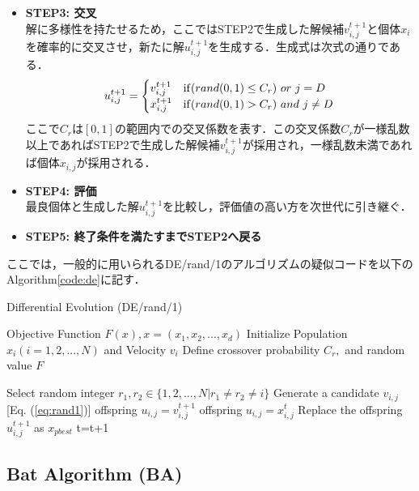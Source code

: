 \documentclass[a4j,11pt]{jarticle}
\begin{document}
\begin{itemize}
\item {\bf STEP3: 交叉} \\
解に多様性を持たせるため，ここではSTEP2で生成した解候補$v_{i,j}^{t+1}$と個体$x_i$を確率的に交叉させ，新たに解$u_{i,j}^{t+1}$を生成する．生成式は次式の通りである．
\begin{equation}
u_{i,j}^{t+1}=\begin{cases}
v_{i,j}^{t+1} & {\rm if}(rand(0,1) \leq C_r) \ or \ j=D \\
x_{i,j}^{t+1} & {\rm if}(rand(0,1) > C_r) \ and \ j \neq D
\end{cases}
\end{equation}
ここで$C_r$は$[0,1]$の範囲内での交叉係数を表す．この交叉係数$C_r$が一様乱数以上であればSTEP2で生成した解候補$v_{i,j}^{t+1}$が採用され，一様乱数未満であれば個体$x_{i,j}$が採用される．

\item {\bf STEP4: 評価} \\
最良個体と生成した解$u_{i,j}^{t+1}$を比較し，評価値の高い方を次世代に引き継ぐ．

\item {\bf STEP5: 終了条件を満たすまでSTEP2へ戻る}
\end{itemize}

ここでは，一般的に用いられるDE/rand/1のアルゴリズムの疑似コードを以下のAlgorithm\ref{code:de}に記す．

\begin{algorithm}[H]
\caption{Differential Evolution (DE/rand/1)}
\label{code:de}
\begin{algorithmic}[3]
\REQUIRE Objective Function $F(x), x=(x_1,x_2,...,x_d)$
\STATE Initialize Population $x_i (i=1,2,...,N)$ and Velocity $v_i$
\STATE Define crossover probability $C_r,$ and random value $F$

\STATE Select random integer $r_1, r_2 \in \{ 1,2,..., N| r_1 \neq r_2 \neq i\}$
\STATE Generate a candidate $v_{i,j}$  [Eq. (\ref{eq:rand1})]
\STATE offspring $u_{i,j} = v_{i,j}^{t+1}$
\STATE offspring $u_{i,j} = x_{i,j}^t$
\ENDIF
\ENDFOR
{}
\STATE Replace the offspring $u_{i,j}^{t+1}$ as $x_{pbest}$
\ENDIF
\ENDFOR
\STATE t=t+1
\ENDWHILE
\end{algorithmic}
\end{algorithm}


\subsection{Bat Algorithm (BA)}
\label{ss:BA}
\end{document}
